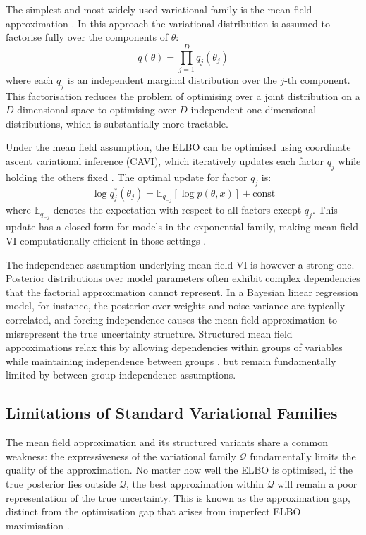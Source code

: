     The simplest and most widely used variational family is the mean field approximation \citep{opper2001}. In this approach the variational distribution is assumed to factorise fully over the components of $\theta$:
    \begin{equation}
        q(\theta) = \prod_{j=1}^D q_j(\theta_j)
    \end{equation}
    where each $q_j$ is an independent marginal distribution over the $j$-th component. This factorisation reduces the problem of optimising over a joint distribution on a $D$-dimensional space to optimising over $D$ independent one-dimensional distributions, which is substantially more tractable.

    Under the mean field assumption, the ELBO can be optimised using coordinate ascent variational inference (CAVI), which iteratively updates each factor $q_j$ while holding the others fixed \citep{bishop2006, blei2017}. The optimal update for factor $q_j$ is:
    \begin{equation}
        \log q_j^*(\theta_j) = \mathbb{E}_{q_{-j}}\left[\log p(\theta, x)\right] + \text{const}
    \end{equation}
    where $\mathbb{E}_{q_{-j}}$ denotes the expectation with respect to all factors except $q_j$. This update has a closed form for models in the exponential family, making mean field VI computationally efficient in those settings \citep{wainwright2008}.

    The independence assumption underlying mean field VI is however a strong one. Posterior distributions over model parameters often exhibit complex dependencies that the factorial approximation cannot represent. In a Bayesian linear regression model, for instance, the posterior over weights and noise variance are typically correlated, and forcing independence causes the mean field approximation to misrepresent the true uncertainty structure. Structured mean field approximations relax this by allowing dependencies within groups of variables while maintaining independence between groups \citep{saul1996}, but remain fundamentally limited by between-group independence assumptions.

    \subsection{Limitations of Standard Variational Families}

    The mean field approximation and its structured variants share a common weakness: the expressiveness of the variational family $\mathcal{Q}$ fundamentally limits the quality of the approximation. No matter how well the ELBO is optimised, if the true posterior lies outside $\mathcal{Q}$, the best approximation within $\mathcal{Q}$ will remain a poor representation of the true uncertainty. This is known as the approximation gap, distinct from the optimisation gap that arises from imperfect ELBO maximisation \citep{turner2011}.

